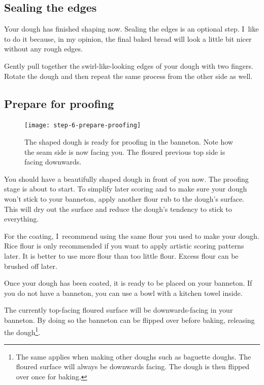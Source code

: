 \subsection[Sealing]{Sealing the edges}

Your dough has finished shaping now. Sealing the edges
is an optional step. I~like to do it because, in my opinion,
the final baked bread will look a little bit nicer without
any rough edges.

Gently pull together the swirl-like-looking edges of your dough
with two fingers. Rotate the dough and then repeat the same process
from the other side as well.

\subsection[Proofing preparation]{Prepare for proofing}

\begin{figure}[htb!]
  \texttt{[image: step-6-prepare-proofing]}
  \caption[Step 5 of shaping process]{The shaped dough is ready for proofing
      in the banneton. Note how the seam side is now facing you. The floured
      previous top side is facing downwards.}%
  \label{fig:shaping-prepare-proofing}
\end{figure}

You should have a beautifully shaped dough in front of you now.
The proofing stage is about to start. To simplify later
scoring and to make sure your dough won't stick to your banneton,
apply another flour rub to the dough's surface. This
will dry out the surface and reduce the dough's tendency
to stick to everything.

For the coating, I~recommend using the same flour you used
to make your dough. Rice flour is only recommended if you
want to apply artistic scoring patterns later. It is better
to use more flour than too little flour. Excess flour can be
brushed off later.

Once your dough has been coated, it is ready to be placed on your banneton.
If you do not have a banneton, you can use a bowl
with a kitchen towel inside.

The currently top-facing floured surface will be downwards-facing in your banneton.
By doing so the banneton can be flipped
over before baking, releasing the dough\footnote{The same
applies when making other doughs such as baguette doughs. The floured
surface will always be downwards facing. The dough is then flipped over
once for baking.}.

